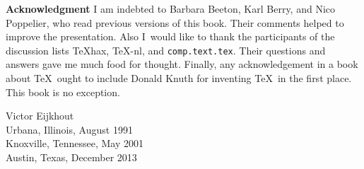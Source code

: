\documentclass[letterpaper]{book}
\begin{document}
\medskip\noindent
{\bf Acknowledgment}\nl
I am indebted to Barbara Beeton, Karl Berry, and Nico Poppelier,
who read previous versions of this book. Their comments
helped to improve the presentation.
Also I~would like to thank the participants of
the discussion lists \TeX hax, \TeX-nl, and {\tt comp.text.tex}.
Their questions and answers gave me much food for thought.
Finally, any acknowledgement in a book about \TeX\ ought to
include Donald Knuth for inventing \TeX\ in the
first place. This book is no exception.

\begin{flushright}
 Victor Eijkhout\\
 Urbana, Illinois, August 1991\\
 Knoxville, Tennessee, May 2001\\
 Austin, Texas, December 2013
\end{flushright}
\end{document}
